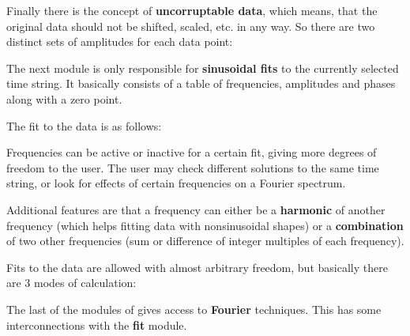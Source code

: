 Finally there is the concept of {\bf uncorruptable data},
which means, that the original data should not be shifted, scaled,
etc. in any way. So there are two distinct sets of amplitudes for each 
data point:


The next module is only responsible for {\bf sinusoidal fits} to the
currently selected time string. 
It basically consists of a table of frequencies,
amplitudes and phases along with a zero point.

The fit to the data is as follows:\\

Frequencies can be active or inactive for a certain fit,
giving more degrees of freedom to the user. The user may check different
solutions to the same time string, or look for effects of certain frequencies
on a Fourier spectrum.

Additional features are that a frequency can either be a {\bf harmonic} 
of another frequency (which helps fitting data with nonsinusoidal
shapes) or a {\bf combination} of two other frequencies 
(sum or difference of integer multiples of each frequency).

Fits to the data are allowed with almost arbitrary freedom,
but basically there are 3 modes of calculation:

The last of the modules of \period gives access to {\bf Fourier} techniques.
This has some interconnections with the {\bf fit} module. 

